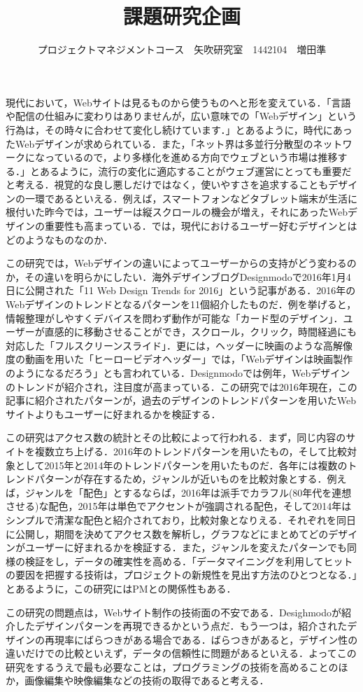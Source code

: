 \documentclass[uplatex,twocolumn,dvipdfmx]{jsarticle}
\title{\vspace{-5mm}\fontsize{14pt}{0pt}\selectfont 課題研究企画}
\author{\normalsize プロジェクトマネジメントコース　矢吹研究室　1442104　増田準}
\date{}
\begin{document}
\fontsize{10.5pt}{\baselineskip}\selectfont
\maketitle





現代において，Webサイトは見るものから使うものへと形を変えている．「言語や配信の仕組みに変わりはありませんが，広い意味での「Webデザイン」という行為は，その時々に合わせて変化し続けています\cite{bib002}．」とあるように，時代にあったWebデザインが求められている．また，「ネット界は多並行分散型のネットワークになっているので，より多様化を進める方向でウェブという市場は推移する\cite{bib001}．」とあるように，流行の変化に適応することがウェブ運営にとっても重要だと考える．視覚的な良し悪しだけではなく，使いやすさを追求することもデザインの一環であるといえる．例えば，スマートフォンなどタブレット端末が生活に根付いた昨今では，ユーザーは縦スクロールの機会が増え，それにあったWebデザインの重要性も高まっている．では，現代におけるユーザー好むデザインとはどのようなものなのか．

この研究では，Webデザインの違いによってユーザーからの支持がどう変わるのか，その違いを明らかにしたい．海外デザインブログDesignmodoで2016年1月4日に公開された「11 Web Design Trends for 2016\cite{bib004}」という記事がある．2016年のWebデザインのトレンドとなるパターンを11個紹介したものだ．例を挙げると，情報整理がしやすくデバイスを問わず動作が可能な「カード型のデザイン」．ユーザーが直感的に移動させることができ，スクロール，クリック，時間経過にも対応した「フルスクリーンスライド」．更には，ヘッダーに映画のような高解像度の動画を用いた「ヒーロービデオヘッダー」では，「Webデザインは映画製作のようになるだろう」とも言われている．Designmodoでは例年，Webデザインのトレンドが紹介され，注目度が高まっている．この研究では2016年現在，この記事に紹介されたパターンが，過去のデザインのトレンドパターンを用いたWebサイトよりもユーザーに好まれるかを検証する．

この研究はアクセス数の統計とその比較によって行われる．まず，同じ内容のサイトを複数立ち上げる．2016年のトレンドパターンを用いたもの，そして比較対象として2015年と2014年のトレンドパターンを用いたものだ．各年には複数のトレンドパターンが存在するため，ジャンルが近いものを比較対象とする．例えば，ジャンルを「配色」とするならば，2016年は派手でカラフル(80年代を連想させる)な配色，2015年は単色でアクセントが強調される配色，そして2014年はシンプルで清潔な配色と紹介されており，比較対象となりえる．それぞれを同日に公開し，期間を決めてアクセス数を解析し，グラフなどにまとめてどのデザインがユーザーに好まれるかを検証する．また，ジャンルを変えたパターンでも同様の検証をし，データの確実性を高める．「データマイニングを利用してヒットの要因を把握する技術は，プロジェクトの新規性を見出す方法のひとつとなる\cite{bib003}．」とあるように，この研究にはPMとの関係性もある．

この研究の問題点は，Webサイト制作の技術面の不安である．Desighmodoが紹介したデザインパターンを再現できるかという点だ．もう一つは，紹介されたデザインの再現率にばらつきがある場合である．ばらつきがあると，デザイン性の違いだけでの比較といえず，データの信頼性に問題があるといえる．よってこの研究をするうえで最も必要なことは，プログラミングの技術を高めることのほか，画像編集や映像編集などの技術の取得であると考える．



\end{document}
